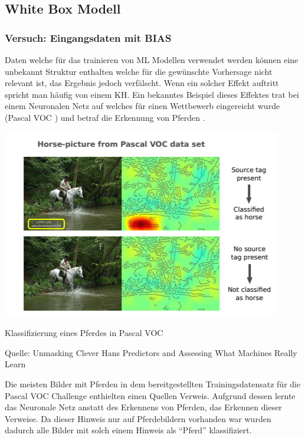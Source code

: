 \documentclass[
  12pt, %
  a4paper, %
  oneside, %
  openany, 
  numbers=noenddot, %
  BCOR=5mm, %
  parskip=half*, %
  thesis, %
]{bfhbook}
\begin{document}
\subsection{White Box Modell}

\subsubsection*{Versuch: Eingangsdaten mit BIAS}
Daten welche für das trainieren von \Gls{ML} Modellen verwendet werden können eine unbekannt Struktur enthalten welche für die gewünschte Vorhersage nicht relevant ist, das Ergebnis jedoch verfälscht. Wenn ein solcher Effekt auftritt spricht man häufig von einem \Gls{KH}. Ein bekanntes Beispiel dieses Effektes trat bei einem Neuronalen Netz auf welches für einen Wettbewerb eingereicht wurde (Pascal VOC \cite{Everingham_thepascal}) und betraf die Erkennung von Pferden \parencite{Lapuschkin2019}. 

\begin{center}
\begin{minipage}[t]{0.45\linewidth}
\vspace{0pt}
\includegraphics[width=\linewidth]{Bilder/HorsePredictionPascalVOC.PNG}
\caption{Klassifizierung eines Pferdes in Pascal VOC}
\caption*{Quelle: Unmasking Clever Hans Predictors and Assessing What Machines Really Learn \cite{Lapuschkin2019}}
\end{minipage}\hfill
\begin{minipage}[t]{0.45\linewidth}
\vspace{20pt}
Die meisten Bilder mit Pferden in dem bereitgestellten Trainingsdatensatz für die Pascal VOC Challenge enthielten einen Quellen Verweis. Aufgrund dessen lernte das Neuronale Netz anstatt des Erkennens von  Pferden, das Erkennen dieser Verweise. Da dieser Hinweis nur auf Pferdebildern vorhanden war wurden dadurch alle Bilder mit solch einem Hinweis als ``Pferd'' klassifiziert.
\end{minipage}
\end{center}
\end{document}
